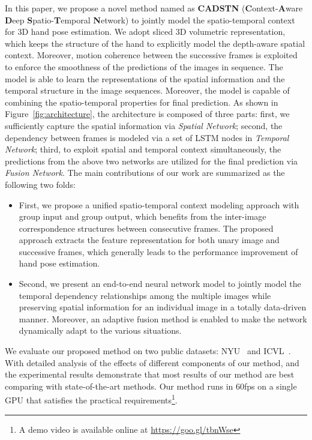 \documentclass[journal,comsoc]{IEEEtran}
\begin{document}
In this paper, we propose a novel method named as \textbf{CADSTN} (\textbf{C}ontext-\textbf{A}ware \textbf{D}eep \textbf{S}patio-\textbf{T}emporal \textbf{N}etwork)
to jointly model the spatio-temporal context for 3D hand pose estimation. We adopt sliced 3D volumetric representation, which keeps the structure of the hand to explicitly model
the depth-aware spatial context. Moreover, motion coherence between the successive frames is
exploited to enforce the smoothness of the predictions of the images in sequence. The model is able to learn the representations of the spatial
information and the temporal structure in the image sequences. Moreover, the model is capable of combining the spatio-temporal
properties for final prediction. As shown in Figure~\ref{fig:architecture}, the architecture is
composed of three parts: first, we sufficiently capture the spatial information via \emph{Spatial Network}; second, the dependency between
frames is modeled via a set of LSTM nodes in \emph{Temporal Network}; third, to exploit spatial and temporal context simultaneously,
the predictions from the above two networks are utilized for the final prediction via \emph{Fusion Network}. The main contributions of our work are summarized as the following two folds:
\begin{itemize}
  \item 
  First, we propose a unified spatio-temporal context modeling approach with group input and group output, which benefits from the inter-image
  correspondence structures between consecutive frames. The proposed approach extracts the feature representation for both unary image and
  successive frames, which generally leads to the performance improvement of hand pose estimation.
  \item 
  Second, we present an end-to-end neural network model to jointly model the temporal dependency relationships among the multiple images while
  preserving spatial information for an individual image in a totally data-driven manner. Moreover, an adaptive fusion method is enabled to make
  the network dynamically adapt to the various situations.
\end{itemize}

We evaluate our proposed method on two public datasets: NYU~\cite{tompson2014real} and ICVL~\cite{sun2015cascaded}.
With detailed analysis of the effects of different components of our method, and the
experimental results demonstrate that most results of our method are best
comparing with state-of-the-art methods. Our method runs in 60fps on a single
GPU that satisfies the practical requirements\footnote{A demo video is available online at
\url{https://goo.gl/tbnWse}}.
\end{document}
